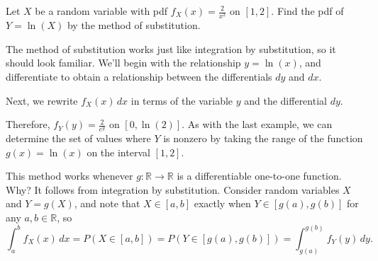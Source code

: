 \begin{examp}Let $X$ be a random variable with pdf $f_X(x) = \frac{2}{x^2}$ on $[1,2]$. Find the pdf of $Y = \ln(X)$ by the method of substitution.
\par
\noindent The method of substitution works just like integration by substitution, so it should look familiar. We'll begin with the relationship $y = \ln(x)$, and differentiate to obtain a relationship between the differentials $dy$ and $dx$.
\par
\noindent Next, we rewrite $f_X(x) \, dx$ in terms of the variable $y$ and the differential $dy$.
\par
\noindent Therefore, $f_Y(y) = \frac{2}{e^y}$ on $[0,\ln(2)]$. As with the last example, we can determine the set of values where $Y$ is nonzero by taking the range of the function $g(x) = \ln(x)$ on the interval $[1,2]$.
\end{examp}
\par
This method works whenever $g: \mathbb{R} \to \mathbb{R}$ is a differentiable one-to-one function. Why? It follows from integration by substitution. Consider random variables $X$ and $Y = g(X)$, and note that $X \in [a,b]$ exactly when $Y \in [g(a),g(b)]$ for any $a,b \in \mathbb{R}$, so
$$\int_{a}^{b} f_X(x)\, dx= P(X \in [a,b]) = P(Y \in [g(a),g(b)]) = \int_{g(a)}^{g(b)} f_Y(y)\, dy.$$

